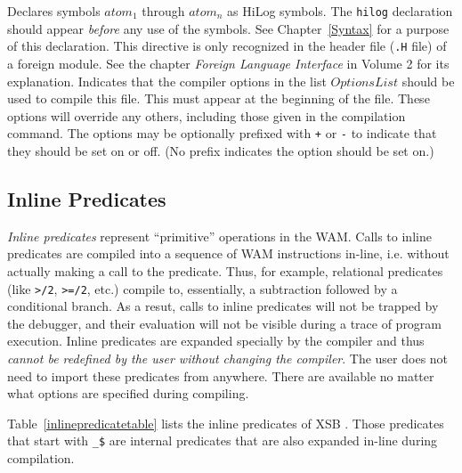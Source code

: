 \begin{description}
	Declares symbols $atom_1$ through $atom_n$ as HiLog symbols.
	The {\tt hilog} declaration should appear {\em before} any use of
	the symbols.  See Chapter~\ref{Syntax} for a purpose of this
 	declaration.
        This directive is only recognized in the header file ({\tt .H} file) 
	of a foreign module. See the chapter {\it Foreign Language
Interface} in Volume 2 for its explanation.
	Indicates that the compiler options in the list $OptionsList$
	should be used to compile this file.  This must appear at the
	beginning of the file.  These options will override any others,
	including those given in the compilation command.  The options
	may be optionally prefixed with \verb|+| or \verb|-| to
	indicate that they should be set on or off.  (No prefix
	indicates the option should be set on.)

\end{description}

\subsection{Inline Predicates}\label{inline_predicates}

{\em Inline predicates} represent ``primitive'' operations in the WAM.
Calls to inline predicates are compiled into a sequence of WAM
instructions in-line, i.e. without actually making a call to the
predicate.  Thus, for example, relational predicates (like {\tt >/2},
{\tt >=/2}, etc.) compile to, essentially, a subtraction followed by a
conditional branch.  As a resut, calls to inline predicates will not
be trapped by the debugger, and their evaluation will not be visible
during a trace of program execution.  Inline predicates are expanded
specially by the compiler and thus {\em cannot be redefined by the
user without changing the compiler}.  The user does not need to import
these predicates from anywhere.  There are available no matter what
options are specified during compiling.

Table~\ref{inlinepredicatetable} lists the inline predicates of
XSB \version.  Those predicates that start with \verb|_$|
are internal predicates that are also expanded in-line during
compilation.

\begin{table}[htbp]
\caption{The Inline Predicates of XSB}\label{inlinepredicatetable}
\end{table}


